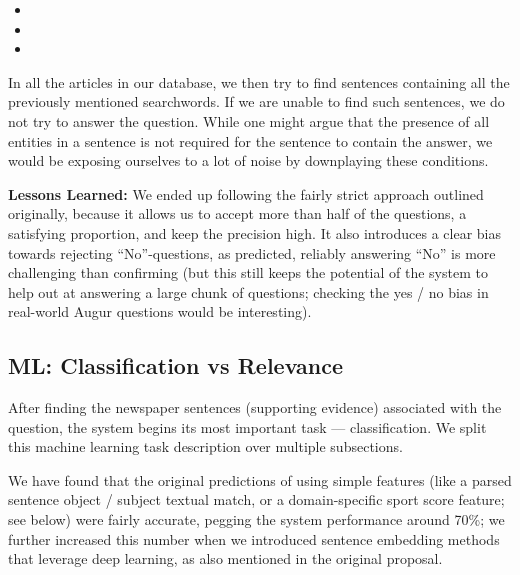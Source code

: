 \documentclass[11pt,a4paper]{article}
\begin{document}
\begin{itemize}

\item {}    

\item {}     

\item {}     

\end{itemize}

In all the articles in our database, we then try to find sentences containing all the previously mentioned searchwords. If we are unable to find such sentences, we do not try to answer the question. While one might argue that the presence of all entities in a sentence is not required for the sentence to contain the answer, we would be exposing ourselves to a lot of noise by downplaying these conditions.

\textbf{Lessons Learned:}  We ended up following the fairly strict
approach outlined originally, because it allows us to accept more
than half of the questions, a satisfying proportion, and keep the
precision high.
It also introduces a clear bias towards rejecting ``No''-questions,
as predicted, reliably answering ``No'' is more challenging than
confirming (but this still keeps the potential of the system to
help out at answering a large chunk of questions; checking the yes / no
bias in real-world Augur questions would be interesting).

\subsection{ML: Classification vs Relevance}

After finding the newspaper sentences (supporting evidence) associated with the question, the system begins its most important task --- classification.
We split this machine learning task description over multiple subsections.

We have found that the original predictions of using simple features (like a parsed sentence object / subject textual match, or a domain-specific sport score feature; see below)
were fairly accurate, pegging the system performance around 70\%;
we further increased this number when we introduced sentence embedding methods that leverage deep learning, as also mentioned in the original proposal.
\end{document}
